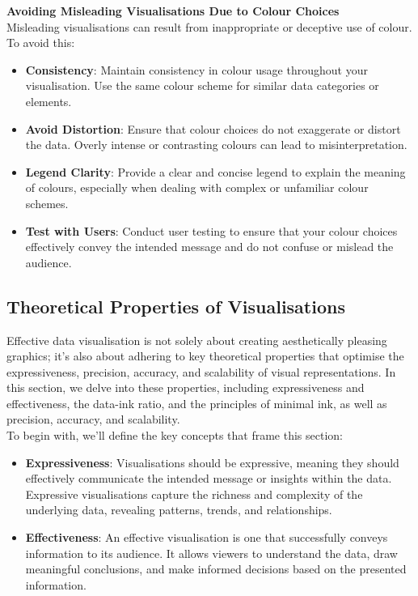 \documentclass{article}\usepackage[]{graphicx}\usepackage[]{xcolor}
\begin{document}
\textbf{Avoiding Misleading Visualisations Due to Colour Choices}\\
Misleading visualisations can result from inappropriate or deceptive use of colour. To avoid this:
\begin{itemize}
    \item \textbf{Consistency}: Maintain consistency in colour usage throughout your visualisation. Use the same colour scheme for similar data categories or elements.
    \item \textbf{Avoid Distortion}: Ensure that colour choices do not exaggerate or distort the data. Overly intense or contrasting colours can lead to misinterpretation.
    \item \textbf{Legend Clarity}:  Provide a clear and concise legend to explain the meaning of colours, especially when dealing with complex or unfamiliar colour schemes. 
    \item \textbf{Test with Users}: Conduct user testing to ensure that your colour choices effectively convey the intended message and do not confuse or mislead the audience.
\end{itemize}

\subsection{Theoretical Properties of Visualisations}
Effective data visualisation is not solely about creating aesthetically pleasing graphics; it's also about adhering to key theoretical properties that optimise the expressiveness, precision, accuracy, and scalability of visual representations. In this section, we delve into these properties, including expressiveness and effectiveness, the data-ink ratio, and the principles of minimal ink, as well as precision, accuracy, and scalability.\\

To begin with, we'll define the key concepts that frame this section:
\begin{itemize}
    \item \textbf{Expressiveness}: Visualisations should be expressive, meaning they should effectively communicate the intended message or insights within the data. Expressive visualisations capture the richness and complexity of the underlying data, revealing patterns, trends, and relationships.
    \item \textbf{Effectiveness}: An effective visualisation is one that successfully conveys information to its audience. It allows viewers to understand the data, draw meaningful conclusions, and make informed decisions based on the presented information.
\end{itemize}
\end{document}
